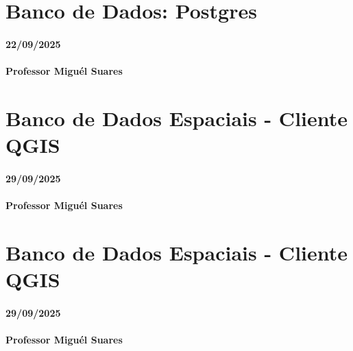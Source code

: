 \documentclass[
]{book}
\begin{document}
\chapter{Banco de Dados: Postgres}\label{banco-de-dados-postgres-1}

\subsubsection*{22/09/2025}\label{section-10}

\subsubsection*{Professor Miguél Suares}\label{professor-miguuxe9l-suares-10}

\chapter{Banco de Dados Espaciais - Cliente QGIS}\label{banco-de-dados-espaciais---cliente-qgis}

\subsubsection*{29/09/2025}\label{section-11}

\subsubsection*{Professor Miguél Suares}\label{professor-miguuxe9l-suares-11}

\chapter{Banco de Dados Espaciais - Cliente QGIS}\label{banco-de-dados-espaciais---cliente-qgis-1}

\subsubsection*{29/09/2025}\label{section-12}

\subsubsection*{Professor Miguél Suares}\label{professor-miguuxe9l-suares-12}
\end{document}
